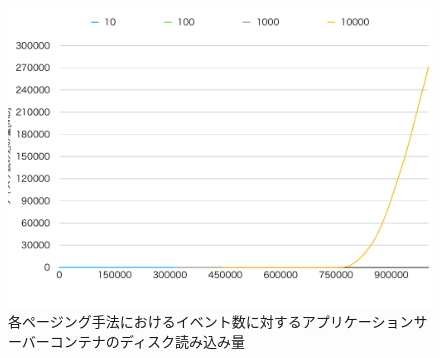\documentclass[../../../../../main]{subfiles}
\begin{document}
    \begin{figure}[H]
        \centering
        \includegraphics[width=12cm]{graph}
        \caption{各ページング手法におけるイベント数に対するアプリケーションサーバーコンテナのディスク読み込み量}
        \label{fig:each-paging-app-disk-out-app_1_1024-db_1_1024}
    \end{figure}
\end{document}
